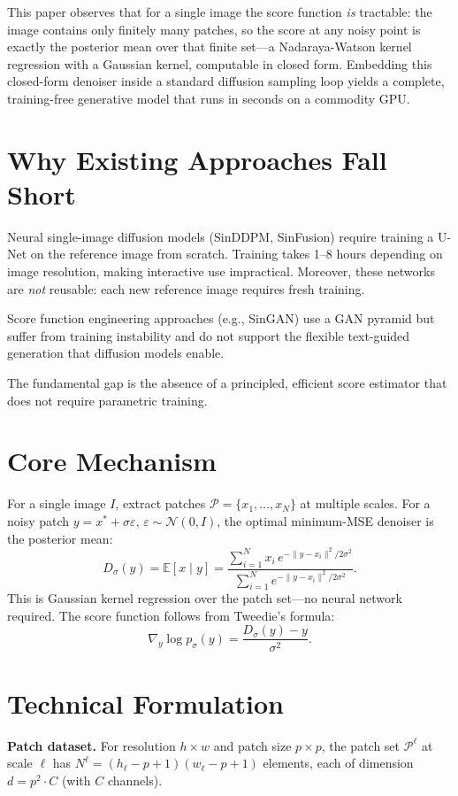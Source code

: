 \documentclass[10pt,twocolumn]{article}
\begin{document}
This paper observes that for a single image the score function \emph{is}
tractable: the image contains only finitely many patches, so the score at any
noisy point is exactly the posterior mean over that finite set---a
Nadaraya-Watson kernel regression with a Gaussian kernel, computable in
closed form. Embedding this closed-form denoiser inside a standard diffusion
sampling loop yields a complete, training-free generative model that runs in
seconds on a commodity GPU.

\section{Why Existing Approaches Fall Short}

Neural single-image diffusion models (SinDDPM, SinFusion) require
training a U-Net on the reference image from scratch. Training takes
1--8 hours depending on image resolution, making interactive use
impractical. Moreover, these networks are \emph{not} reusable: each new
reference image requires fresh training.

Score function engineering approaches (e.g., SinGAN) use a GAN
pyramid but suffer from training instability and do not support
the flexible text-guided generation that diffusion models enable.

The fundamental gap is the absence of a principled, efficient score
estimator that does not require parametric training.

\section{Core Mechanism}

For a single image $I$, extract patches $\mathcal{P} = \{x_1,\ldots,x_N\}$
at multiple scales. For a noisy patch $y = x^* + \sigma\varepsilon$,
$\varepsilon\sim\mathcal{N}(0,I)$, the optimal minimum-MSE denoiser is the
posterior mean:
\[
D_\sigma(y) = \mathbb{E}[x \mid y]
= \frac{\sum_{i=1}^{N} x_i\,e^{-\|y-x_i\|^2/2\sigma^2}}
       {\sum_{i=1}^{N} e^{-\|y-x_i\|^2/2\sigma^2}}.
\]
This is Gaussian kernel regression over the patch set---no neural network
required. The score function follows from Tweedie's formula:
\[
\nabla_y \log p_\sigma(y) = \frac{D_\sigma(y) - y}{\sigma^2}.
\]

\section{Technical Formulation}

\textbf{Patch dataset.}
For resolution $h\times w$ and patch size $p\times p$, the patch set
$\mathcal{P}^\ell$ at scale $\ell$ has $N^\ell = (h_\ell - p + 1)(w_\ell - p + 1)$
elements, each of dimension $d = p^2 \cdot C$ (with $C$ channels).
\end{document}
